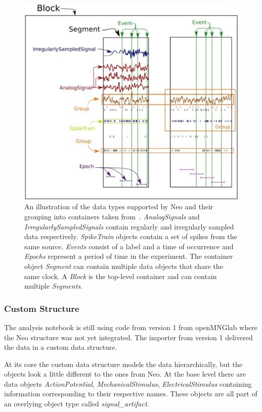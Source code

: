 \begin{figure}
	\includegraphics[width = \textwidth]{src/pic/neo_structure}
	\caption{An illustration of the data types supported by Neo and their grouping into containers taken from~\cite{neo14}. \textit{AnalogSignals} and \textit{IrregularlySampledSignals} contain regularly and irregularly sampled data respectively. \textit{SpikeTrain} objects contain a set of spikes from the same source. \textit{Events} consist of a label and a time of occurrence and \textit{Epochs} represent a period of time in the experiment. The container object \textit{Segment} can contain multiple data objects that share the same clock. A \textit{Block} is the top-level container and can contain multiple \textit{Segments}.}
	\label{fig:neostructure}
\end{figure}

\subsubsection{Custom Structure}
The analysis notebook is still using code from version 1 from openMNGlab where the Neo structure was not yet integrated. The importer from version 1 delivered the data in a custom data structure.

At its core the custom data structure models the data hierarchically, but the objects look a little different to the ones from Neo. At the base level there are data objects \textit{ActionPotential}, \textit{MechanicalStimulus}, \textit{ElectricalStimulus} containing information corresponding to their respective names. These objects are all part of an overlying object type called \textit{signal\_artifact}.

